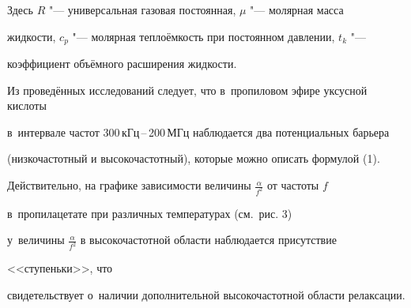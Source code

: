 Здесь $R$ "--- универсальная газовая постоянная, $\mu $ "--- молярная масса 

жидкости, $c_p $ "--- молярная теплоёмкость при постоянном давлении, $t_k $ "--- 

коэффициент объёмного расширения жидкости.



Из проведённых исследований следует, что в~пропиловом эфире уксусной кислоты 

в~интервале частот 300\,кГц\,--\,200\,МГц наблюдается два потенциальных барьера 

(низкочастотный и высокочастотный), которые можно описать формулой (1). 

Действительно, на графике зависимости величины $\frac{\alpha }{f^2}$ от частоты $f$ 

в~пропилацетате при различных температурах (см.~рис. 3)

у~величины $\frac{\alpha }{f^2}$ в высокочастотной области наблюдается присутствие 

<<ступеньки>>, что 

свидетельствует о~наличии дополнительной высокочастотной области релаксации.



